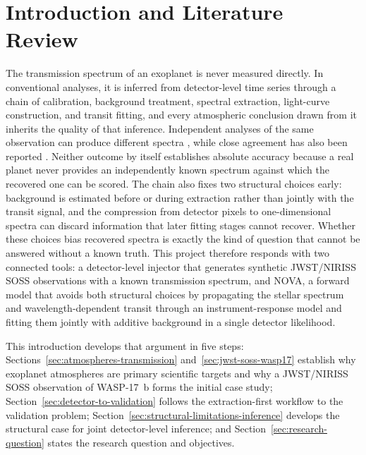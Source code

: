 \section{Introduction and Literature Review}
\label{sec:introduction}

The transmission spectrum of an exoplanet is never measured directly. In
conventional analyses, it is inferred from detector-level time series through
a chain of calibration, background treatment, spectral extraction, light-curve
construction, and transit fitting, and every atmospheric conclusion drawn from
it inherits the quality of that inference. Independent analyses of the same
observation can produce different spectra
\citep{ConstantinouEtAl2023,KirkEtAl2024}, while
close agreement has also been reported \citep{LouieEtAl2025}. Neither outcome
by itself establishes absolute accuracy because a real planet never provides
an independently known spectrum against which the recovered one can be scored.
The chain also fixes two structural choices early: background is
estimated before or during extraction rather than jointly with the transit
signal, and the compression from detector pixels to one-dimensional spectra
can discard information that later fitting stages cannot recover. Whether
these choices bias recovered spectra is exactly the kind of question that
cannot be answered without a known truth. This project therefore responds
with two connected tools: a detector-level injector that generates synthetic
JWST/NIRISS SOSS observations with a known transmission spectrum, and NOVA, a
forward model that avoids both structural choices by propagating the stellar
spectrum and wavelength-dependent transit through an instrument-response
model and fitting them jointly with additive background in a single detector
likelihood.

This introduction develops that argument in five steps:
Sections~\ref{sec:atmospheres-transmission}
and~\ref{sec:jwst-soss-wasp17} establish why exoplanet atmospheres are primary
scientific targets and why a JWST/NIRISS SOSS observation of WASP-17~b forms the
initial case study; Section~\ref{sec:detector-to-validation} follows the
extraction-first workflow to the validation problem;
Section~\ref{sec:structural-limitations-inference} develops the structural
case for joint detector-level inference; and
Section~\ref{sec:research-question} states the research question and
objectives.
